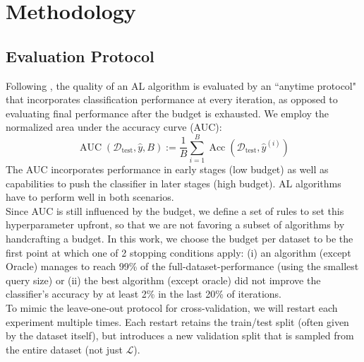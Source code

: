 \documentclass[]{article}
\newcommand{\D}{\mathcal{D}}
\newcommand{\LL}{\mathcal{L}}
\newcommand{\test}{\text{test}}
\begin{document}
\section{Methodology}

\subsection{Evaluation Protocol}\label{sec:evaluation}
Following \cite{zhou2021towards}, the quality of an AL algorithm is evaluated by an ``anytime protocol" that incorporates classification performance at every iteration, as opposed to evaluating final performance after the budget is exhausted.
We employ the normalized area under the accuracy curve (AUC):
\begin{equation}\label{eq:auc}
	\operatorname{AUC}(\D_\test, \hat y, B) := \frac{1}{B} \sum_{i=1}^{B} \operatorname{Acc}(\D_\test, \hat y^{(i)})
\end{equation}
The AUC incorporates performance in early stages (low budget) as well as capabilities to push the classifier in later stages (high budget).
AL algorithms have to perform well in both scenarios. 
\\ [1mm]
Since AUC is still influenced by the budget, we define a set of rules to set this hyperparameter upfront, so that we are not favoring a subset of algorithms by handcrafting a budget.
In this work, we choose the budget per dataset to be the first point at which one of 2 stopping conditions apply: (i) an algorithm (except Oracle) manages to reach 99\% of the full-dataset-performance (using the smallest query size) or (ii) the best algorithm (except oracle) did not improve the classifier's accuracy by at least 2\% in the last 20\% of iterations. \\ [1mm]
To mimic the leave-one-out protocol for cross-validation, we will restart each experiment multiple times.
Each restart retains the train/test split (often given by the dataset itself), but introduces a new validation split that is sampled from the entire dataset (not just $\LL$).

\end{document}
